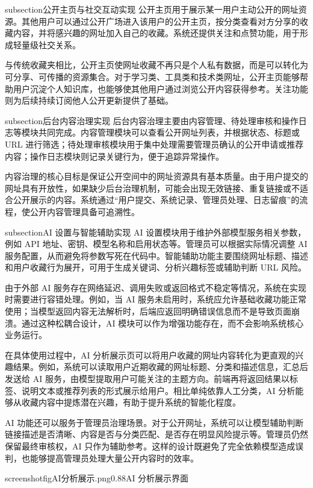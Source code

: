 subsection{公开主页与社交互动实现}
公开主页用于展示某一用户主动公开的网址资源。其他用户可以通过公开广场进入该用户的公开主页，按分类查看对方分享的收藏内容，并将感兴趣的网址加入自己的收藏。系统还提供关注和点赞功能，用于形成轻量级社交关系。

与传统收藏夹相比，公开主页使网址收藏不再只是个人私有数据，而是可以转化为可分享、可传播的资源集合。对于学习类、工具类和技术类网址，公开主页能够帮助用户沉淀个人知识库，也能够使其他用户通过浏览公开内容获得参考。关注功能则为后续持续订阅他人公开更新提供了基础。

subsection{后台内容治理实现}
后台内容治理主要由内容管理、待处理审核和操作日志等模块共同完成。内容管理模块可以查看公开网址列表，并根据状态、标题或 URL 进行筛选；待处理审核模块用于集中处理需要管理员确认的公开申请或推荐内容；操作日志模块则记录关键行为，便于追踪异常操作。

内容治理的核心目标是保证公开空间中的网址资源具有基本质量。由于用户提交的网址具有开放性，如果缺少后台治理机制，可能会出现无效链接、重复链接或不适合公开展示的内容。系统通过“用户提交、系统记录、管理员处理、日志留痕”的流程，使公开内容管理具备可追溯性。

subsection{AI 设置与智能辅助实现}
AI 设置模块用于维护外部模型服务相关参数，例如 API 地址、密钥、模型名称和启用状态等。管理员可以根据实际情况调整 AI 服务配置，从而避免将参数写死在代码中。智能辅助功能主要围绕网址标题、描述和用户收藏行为展开，可用于生成关键词、分析兴趣标签或辅助判断 URL 风险。

由于外部 AI 服务存在网络延迟、调用失败或返回格式不稳定等情况，系统在实现时需要进行容错处理。例如，当 AI 服务未启用时，系统应允许基础收藏功能正常使用；当模型返回内容无法解析时，后端应返回明确错误信息而不是导致页面崩溃。通过这种松耦合设计，AI 模块可以作为增强功能存在，而不会影响系统核心业务运行。

在具体使用过程中，AI 分析展示页可以将用户收藏的网址内容转化为更直观的兴趣结果。例如，系统可以读取用户近期收藏的网址标题、分类和描述信息，汇总后发送给 AI 服务，由模型提取用户可能关注的主题方向。前端再将返回结果以标签、说明文本或推荐列表的形式展示给用户。相比单纯依靠人工分类，AI 分析能够从收藏内容中提炼潜在兴趣，有助于提升系统的智能化程度。

AI 功能还可以服务于管理员治理场景。对于公开网址，系统可以让模型辅助判断链接描述是否清晰、内容是否与分类匹配、是否存在明显风险提示等。管理员仍然保留最终审核权，AI 只作为辅助参考。这样的设计既避免了完全依赖模型造成误判，也能够提高管理员处理大量公开内容时的效率。

screenshotfig{AI分析展示.png}{0.88}{AI 分析展示界面}

